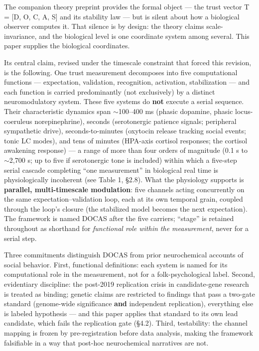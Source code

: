 \documentclass[
]{article}
\begin{document}
The companion theory preprint provides the formal object --- the trust
vector T = {[}D, O, C, A, S{]} and its stability law --- but is silent
about how a biological observer computes it. That silence is by design:
the theory claims scale-invariance, and the biological level is one
coordinate system among several. This paper supplies the biological
coordinates.

Its central claim, revised under the timescale constraint that forced
this revision, is the following. One trust measurement decomposes into
five computational functions --- expectation, validation, recognition,
activation, stabilization --- and each function is carried predominantly
(not exclusively) by a distinct neuromodulatory system. These five
systems do \textbf{not} execute a serial sequence. Their characteristic
dynamics span \(\sim\)100--400 ms (phasic dopamine, phasic
locus-coeruleus norepinephrine), seconds (serotonergic patience signals;
peripheral sympathetic drive), seconds-to-minutes (oxytocin release
tracking social events; tonic LC modes), and tens of minutes (HPA-axis
cortisol responses; the cortisol awakening response) --- a range of more
than four orders of magnitude (0.1 s to \(\sim\)2,700 s; up to five if
serotonergic tone is included) within which a five-step serial cascade
completing ``one measurement'' in biological real time is
physiologically incoherent (see Table 1, §2.8). What the physiology
supports is \textbf{parallel, multi-timescale modulation}: five channels
acting concurrently on the same expectation--validation loop, each at
its own temporal grain, coupled through the loop's closure (the
stabilized model becomes the next expectation). The framework is named
DOCAS after the five carriers; ``stage'' is retained throughout as
shorthand for \emph{functional role within the measurement}, never for a
serial step.

Three commitments distinguish DOCAS from prior neurochemical accounts of
social behavior. First, functional definitions: each system is named for
its computational role in the measurement, not for a folk-psychological
label. Second, evidentiary discipline: the post-2019 replication crisis
in candidate-gene research is treated as binding; genetic claims are
restricted to findings that pass a two-gate standard (genome-wide
significance \textbf{and} independent replication), everything else is
labeled hypothesis --- and this paper applies that standard to its own
lead candidate, which fails the replication gate (§4.2). Third,
testability: the channel mapping is frozen by pre-registration before
data analysis, making the framework falsifiable in a way that post-hoc
neurochemical narratives are not.
\end{document}
